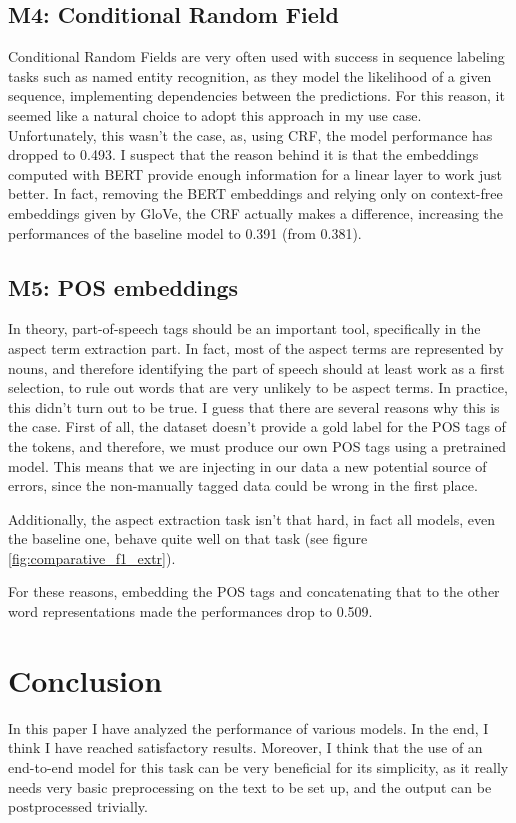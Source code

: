 \documentclass[11pt,a4paper]{article}
\begin{document}
	\subsection{M4: Conditional Random Field}
	Conditional Random Fields \citep{lafferty2001conditional} are very often used
	with success in sequence labeling tasks such as named entity recognition, as
	they model the likelihood of a given sequence, implementing dependencies between
	the predictions.  For this reason, it seemed like a natural choice to adopt this
	approach in my use case. Unfortunately, this wasn't the case, as, using CRF, the
	model performance has dropped to 0.493. I suspect that the reason behind it is
	that the embeddings computed with BERT provide enough information for a linear
	layer to work just better. In fact, removing the BERT embeddings and relying
	only on context-free embeddings given by GloVe, the CRF actually makes a
	difference, increasing the performances of the baseline model to 0.391 (from
	0.381).
	
	\subsection{M5: POS embeddings}
	In theory, part-of-speech tags should be an important tool, specifically in the
	aspect term extraction part. In fact, most of the aspect terms are represented
	by nouns, and therefore identifying the part of speech should at least work as a
	first selection, to rule out words that are very unlikely to be aspect terms. In
	practice, this didn't turn out to be true. I guess that there are several
	reasons why this is the case. First of all, the dataset doesn't provide a gold
	label for the POS tags of the tokens, and therefore, we must produce our own POS
	tags using a pretrained model. This means that we are injecting in our data a
	new potential source of errors, since the non-manually tagged data could be
	wrong in the first place.
	
	Additionally, the aspect extraction task isn't that hard, in fact all models,
	even the baseline one, behave quite well on that task (see figure
	\ref{fig:comparative_f1_extr}).
	
	For these reasons, embedding the POS tags and concatenating that to the other
	word representations made the performances drop to 0.509.
	
	\section{Conclusion}
	In this paper I have analyzed the performance of various models. In the end, I think I have reached satisfactory results. Moreover, I
	think that the use of an end-to-end model for this task can be very beneficial
	for its simplicity, as it really needs very basic preprocessing on the text to
	be set up, and the output can be postprocessed trivially.
	
\end{document}
